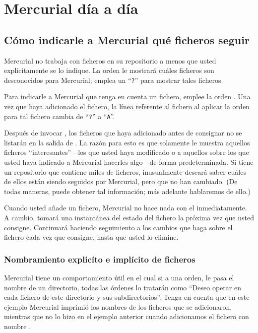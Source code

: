 \chapter{Mercurial día a día}
\label{chap:daily}

\section{Cómo indicarle a Mercurial qué ficheros seguir}

Mercurial no trabaja con ficheros en su repositorio a menos que usted
explícitamente se lo indique.  La orden  le mostrará
cuáles ficheros son desconocidos para Mercurial; emplea un
``\texttt{?}'' para mostrar tales ficheros.

Para indicarle a Mercurial que tenga en cuenta un fichero, emplee la
orden . Una vez que haya adicionado el fichero, la línea
referente al fichero al aplicar la orden  para tal
fichero cambia de ``\texttt{?}'' a ``\texttt{A}''.

Después de invocar , los ficheros que haya adicionado
antes de consignar no se listarán en la salida de .  La
razón para esto es que  solamente le muestra aquellos
ficheros ``interesantes''---los que usted haya modificado o a aquellos
sobre los que usted haya indicado a Mercurial hacerles algo---de forma
predeterminada. Si tiene un repositorio que contiene miles de
ficheros, inusualmente deseará saber cuáles de ellos están siendo
seguidos por Mercurial, pero que no han cambiado.  (De todas maneras,
puede obtener tal información; más adelante hablaremos de ello.)


Cuando usted añade un fichero, Mercurial no hace nada con el inmediatamente.
A cambio, tomará una instantánea del estado del fichero la próxima vez
que usted consigne. Continuará haciendo seguimiento a los cambios que
haga sobre el fichero cada vez que consigne, hasta que usted lo elimine.

\subsection{Nombramiento explicíto e implícito de ficheros}

Mercurial tiene un comportamiento útil en el cual si a una orden,
le pasa el nombre de un directorio, todas las órdenes lo tratarán como
``Deseo operar en cada fichero de este directorio y sus 
subdirectorios''.
Tenga en cuenta que en este ejemplo Mercurial imprimió los nombres de
los ficheros que se adicionaron, mientras que no lo hizo en el ejemplo
anterior cuando adicionamos el fichero con nombre .

